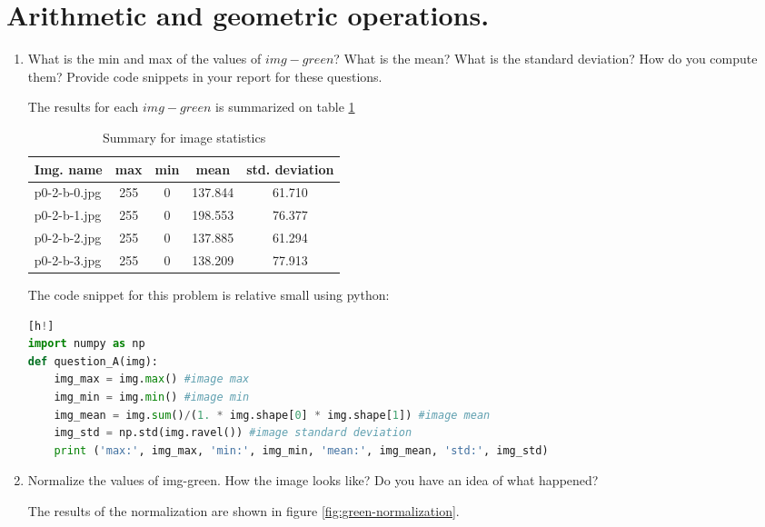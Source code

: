\section{Arithmetic and geometric operations.}
\begin{enumerate}[label=\emph{\alph*)}]
\item What is the min and max of the values of $img-green$? What is the mean? What is the standard deviation? How do you compute them? Provide code snippets in your report for these questions.

The results for each $img-green$ is summarized on table \ref{table:statistics}

\begin{table} [!htb]
\setlength{\tabcolsep}{2.7mm}
\centering
\begin{tabular}{lcccc}
\toprule
\textbf{Img. name}  & \textbf{max} & \textbf{min} & \textbf{mean} & \textbf{std. deviation}\\
\midrule
p0-2-b-0.jpg & 255 & 0 & 137.844 & 61.710 \\
p0-2-b-1.jpg & 255 & 0 & 198.553 & 76.377 \\
p0-2-b-2.jpg & 255 & 0 & 137.885 & 61.294 \\
p0-2-b-3.jpg & 255 & 0 & 138.209 & 77.913 \\
\bottomrule
\end{tabular}
\caption{Summary for image statistics}
\label{table:statistics}
\end{table}

\vspace{1.5cm}

The code snippet for this problem is relative small using python:

\begin{lstlisting}[language=python][h!]
import numpy as np
def question_A(img):
	img_max = img.max() #image max
	img_min = img.min() #image min
	img_mean = img.sum()/(1. * img.shape[0] * img.shape[1]) #image mean
	img_std = np.std(img.ravel()) #image standard deviation
	print ('max:', img_max, 'min:', img_min, 'mean:', img_mean, 'std:', img_std)
\end{lstlisting}

\item Normalize the values of img-green. How the image looks like? Do you have an idea of what happened?

The results of the normalization are shown in figure \ref{fig:green-normalization}.


\end{enumerate}
